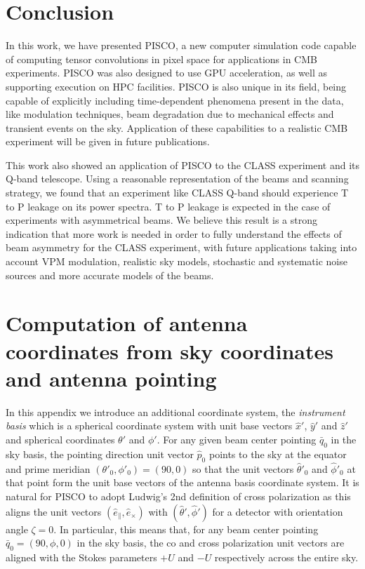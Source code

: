 \documentclass[a4paper,11pt]{article}
\newcommand{\co}{\mathbin{\|}}
\newcommand{\cx}{\mathbin{\times}}
\begin{document}
\section{Conclusion}
\label{sec::conclusions}

In this work, we have presented PISCO, a new computer simulation code capable of computing tensor convolutions in pixel space for applications in CMB experiments. PISCO was also designed to use GPU acceleration, as well as supporting execution on HPC facilities. PISCO is also unique in its field, being capable of explicitly including time-dependent phenomena present in the data, like modulation techniques, beam degradation due to mechanical effects and transient events on the sky. Application of these capabilities to a realistic CMB experiment will be given in future publications.

This work also showed an application of PISCO to the CLASS experiment and its Q-band telescope. Using a reasonable representation of the beams and scanning strategy, we found that an experiment like CLASS Q-band should experience T to P leakage on its power spectra. T to P leakage is expected in the case of experiments with asymmetrical beams. We believe this result is a strong indication that more work is needed in order to fully understand the effects of beam asymmetry for the CLASS experiment, with future applications taking into account VPM modulation, realistic sky models, stochastic and systematic noise sources and more accurate models of the beams.




\appendix
\section{Computation of antenna coordinates from sky coordinates and antenna pointing}

In this appendix we introduce an additional coordinate system, the \textsl{instrument basis} which is a spherical coordinate system with unit base vectors $\hat{x}'$, $\hat{y}'$ and $\hat{z}'$ and spherical coordinates $\theta'$ and $\phi'$. For any given beam center pointing $\bar{q}_0$ in the sky basis, the pointing direction unit vector $\hat{p}_0$ points to the sky at the equator and prime meridian $(\theta'_0,\phi'_0) = (90,0)$ so that the unit vectors $\hat{\theta}'_0$ and $\hat{\phi}'_0$ at that point form the unit base vectors of the antenna basis coordinate system. It is natural for PISCO to adopt Ludwig's 2nd definition of cross polarization \cite{1140406} as this aligns the unit vectors $(\hat{e}_{\co},\hat{e}_{\cx})$ with $(\hat{\theta}',\hat{\phi}')$ for a detector with orientation angle $\zeta = 0$. In particular, this means that, for any beam center pointing $\bar{q}_0 = (90,\phi,0)$ in the sky basis, the co and cross polarization unit vectors are aligned with the Stokes parameters $+U$ and $-U$ respectively across the entire sky.
\end{document}
